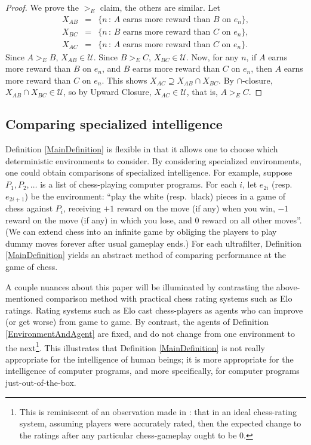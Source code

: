 \documentclass[twoside,11pt]{article}
\begin{document}
\begin{proof}
    We prove the $>_{E}$ claim, the others are similar.
    Let
    \begin{eqnarray*}
        X_{AB} &=& \{n\,:\,\mbox{$A$ earns more reward than $B$ on $e_n$}\},\\
        X_{BC} &=& \{n\,:\,\mbox{$B$ earns more reward than $C$ on $e_n$}\},\\
        X_{AC} &=& \{n\,:\,\mbox{$A$ earns more reward than $C$ on $e_n$}\}.
    \end{eqnarray*}
    Since $A>_{E}B$, $X_{AB}\in\mathscr U$.
    Since $B>_{E}C$, $X_{BC}\in\mathscr U$.
    Now, for any $n$, if $A$ earns more reward than $B$ on $e_n$,
    and $B$ earns more reward than $C$ on $e_n$,
    then $A$ earns more reward than $C$ on $e_n$.
    This shows $X_{AC}\supseteq X_{AB}\cap X_{BC}$.
    By $\cap$-closure, $X_{AB}\cap X_{BC}\in\mathscr U$,
    so by Upward Closure, $X_{AC}\in\mathscr U$, that is, $A>_{E}C$.
\end{proof}

    \subsection{Comparing specialized intelligence}

    Definition \ref{MainDefinition} is flexible in that it
    allows one to choose which deterministic environments to consider.
    By considering specialized environments, one could obtain
    comparisons of specialized intelligence. For example,
    suppose $P_1,P_2,\ldots$ is a list of
    chess-playing computer programs. For each $i$, let $e_{2i}$
    (resp.\ $e_{2i+1}$)
    be the environment: ``play the white (resp.\ black) pieces
    in a game of chess against $P_i$, receiving $+1$ reward
    on the move (if any) when you win, $-1$ reward
    on the move (if any) in which you lose, and $0$
    reward on all other moves''. (We can extend chess into an
    infinite game by obliging the players to play
    dummy moves forever after usual gameplay ends.)
    For each ultrafilter, Definition \ref{MainDefinition} yields
    an abstract method of comparing performance at the game of
    chess.

    A couple nuances about this paper will be illuminated by contrasting
    the above-mentioned comparison method with practical chess
    rating systems such as Elo ratings. Rating systems such as Elo
    cast chess-players as agents who can improve (or get worse)
    from game to game. By contrast, the agents of
    Definition \ref{EnvironmentAndAgent} are fixed, and do not
    change from one environment to the next\footnote{This is reminiscent of
    an observation made in \citet{good}: that in an ideal chess-rating system,
    assuming players were accurately rated, then the expected change to the ratings
    after any particular chess-gameplay ought to be $0$.}. This illustrates that
    Definition \ref{MainDefinition} is not really appropriate for
    the intelligence of human beings; it is more appropriate
    for the intelligence of computer programs, and more specifically,
    for computer programs just-out-of-the-box.
\end{document}
